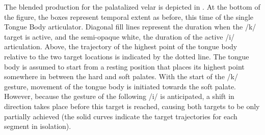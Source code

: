 The blended production for the palatalized velar is depicted in . 
At the bottom of the figure, the boxes represent
temporal extent as before, this time of the single Tongue Body articulator.
Diagonal fill lines represent the duration when the {/k/}
target is active, and the semi-opaque white, the duration of the active
{/i/} articulation. Above, the trajectory of the highest
point of the tongue body relative to the two target locations is indicated
by the dotted line. The tongue body is assumed to start from a resting
position that places its highest point somewhere in between the hard
and soft palates. With the start of the {/k/} gesture, movement
of the tongue body is initiated towards the soft palate. However,
because the gesture of the following {/i/} is anticipated,
a shift in direction takes place before this target is reached, causing
both targets to be only partially achieved (the solid curves indicate
the target trajectories for each segment in isolation). 

